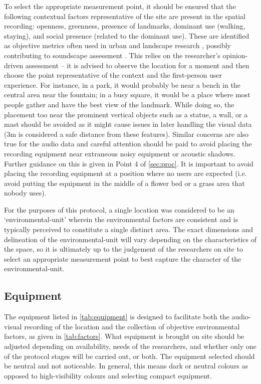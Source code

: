    To select the appropriate measurement point, it should be ensured that the following contextual factors representative of the site are present in the spatial recording: openness, greenness, presence of landmarks, dominant use (walking, staying), and social presence (related to the dominant use). These are identified as objective metrics often used in urban and landscape research \citep{Lynch1964,Kaplan1989,Ewing2013,Quercia2014Aesthetic,Joglekar2020Facelift}, possibly contributing to soundscape assessment \citep{Aletta2019Exploring,Pheasant2010importance}. This relies on the researcher's opinion-driven assessment -- it is advised to observe the location for a moment and then choose the point representative of the context and the first-person user experience. For instance, in a park, it would probably be near a bench in the central area near the fountain; in a busy square, it would be a place where most people gather and have the best view of the landmark. While doing so, the placement too near the prominent vertical objects such as a statue, a wall, or a mast should be avoided as it might cause issues in later handling the visual data (3m is considered a safe distance from these features). Similar concerns are also true for the audio data and careful attention should be paid to avoid placing the recording equipment near extraneous noisy equipment or acoustic shadows. Further guidance on this is given in Point 4 of \cref{sec:proc}. It is important to avoid placing the recording equipment at a position where no users are expected (i.e. avoid putting the equipment in the middle of a flower bed or a grass area that nobody uses).

   For the purposes of this protocol, a single location was considered to be an `\gls{environmental-unit}' wherein the environmental factors are consistent and is typically perceived to constitute a single distinct area. The exact dimensions and delineation of the \gls{environmental-unit} will vary depending on the characteristics of the space, so it is ultimately up to the judgement of the researchers on site to select an appropriate measurement point to best capture the character of the \gls{environmental-unit}.

 \subsection{Equipment}
   \label{sec:equipment}
   The equipment listed in \cref{tab:equipment} is designed to facilitate both the audio-visual recording of the location and the collection of objective environmental factors, as given in \cref{tab:factors}. What equipment is brought on site should be adjusted depending on availability, needs of the researchers, and whether only one of the protocol stages will be carried out, or both. The equipment selected should be neutral and not noticeable. In general, this means dark or neutral colours as opposed to high-visibility colours and selecting compact equipment.

